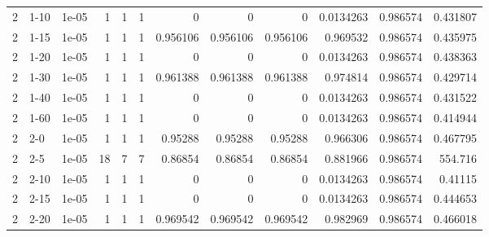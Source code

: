\begin{tabular}{rlrrrrrrrrrr}
     2 & 1-10   &      1e-05 &           1 &                 1 &                 1 &        0        &        0        &         0        &        0.0134263 &               0.986574 &           0.431807 \\
     2 & 1-15   &      1e-05 &           1 &                 1 &                 1 &        0.956106 &        0.956106 &         0.956106 &        0.969532  &               0.986574 &           0.435975 \\
     2 & 1-20   &      1e-05 &           1 &                 1 &                 1 &        0        &        0        &         0        &        0.0134263 &               0.986574 &           0.438363 \\
     2 & 1-30   &      1e-05 &           1 &                 1 &                 1 &        0.961388 &        0.961388 &         0.961388 &        0.974814  &               0.986574 &           0.429714 \\
     2 & 1-40   &      1e-05 &           1 &                 1 &                 1 &        0        &        0        &         0        &        0.0134263 &               0.986574 &           0.431522 \\
     2 & 1-60   &      1e-05 &           1 &                 1 &                 1 &        0        &        0        &         0        &        0.0134263 &               0.986574 &           0.414944 \\
     2 & 2-0    &      1e-05 &           1 &                 1 &                 1 &        0.95288  &        0.95288  &         0.95288  &        0.966306  &               0.986574 &           0.467795 \\
     2 & 2-5    &      1e-05 &          18 &                 7 &                 7 &        0.86854  &        0.86854  &         0.86854  &        0.881966  &               0.986574 &         554.716    \\
     2 & 2-10   &      1e-05 &           1 &                 1 &                 1 &        0        &        0        &         0        &        0.0134263 &               0.986574 &           0.41115  \\
     2 & 2-15   &      1e-05 &           1 &                 1 &                 1 &        0        &        0        &         0        &        0.0134263 &               0.986574 &           0.444653 \\
     2 & 2-20   &      1e-05 &           1 &                 1 &                 1 &        0.969542 &        0.969542 &         0.969542 &        0.982969  &               0.986574 &           0.466018 \\

\end{tabular}
